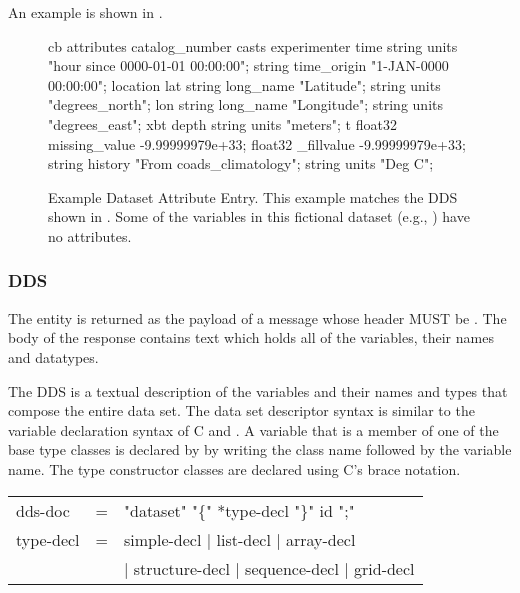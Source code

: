 \documentclass[justify]{dods-paper}
\begin{document}
An example \DAS is shown in .

\begin{figure}
\begin{vcode}{cb}
attributes {
   catalog_number {
   }
   casts {
      experimenter {
      }
      time {
         string units "hour since 0000-01-01 00:00:00";
         string time_origin "1-JAN-0000 00:00:00";
      }
      location {
         lat {
            string long_name "Latitude";
            string units "degrees_north";
         }
         lon {
            string long_name "Longitude";
            string units "degrees_east";
         }
      }
      xbt {
         depth {
            string units "meters";
         }
         t {
            float32 missing_value -9.99999979e+33;
            float32 _fillvalue -9.99999979e+33;
            string history "From coads_climatology";
            string units "Deg C";
         }
      }
   }
}
\end{vcode}
\caption{Example Dataset Attribute Entry. This example matches the DDS shown
   in . Some of the variables in this fictional dataset
   (e.g., ) have no attributes. }
\label{fig-das}
\end{figure}

\subsubsection{DDS}
\label{sec-dds}
The \DDS entity is returned as the payload of a message whose
 header MUST be . The body of the
response contains text which holds all of the variables, their names and
datatypes.

The DDS is a textual description of the variables and their names and
types that compose the entire data set. The data set descriptor syntax
is similar to the variable declaration syntax of C and \Cpp. A
variable that is a member of one of the base type classes is declared
by by writing the class name followed by the variable name. The type
constructor classes are declared using C's brace notation.

\begin{ttfamily}
\begin{center}
\begin{tabular}{lll}
dds-doc & = & "dataset" "\{" *type-decl "\}" id ";" \\
type-decl & = & simple-decl | list-decl | array-decl \\
          & & | structure-decl | sequence-decl | grid-decl \\
\end{tabular}
\end{center}
\end{ttfamily}
\end{document}
